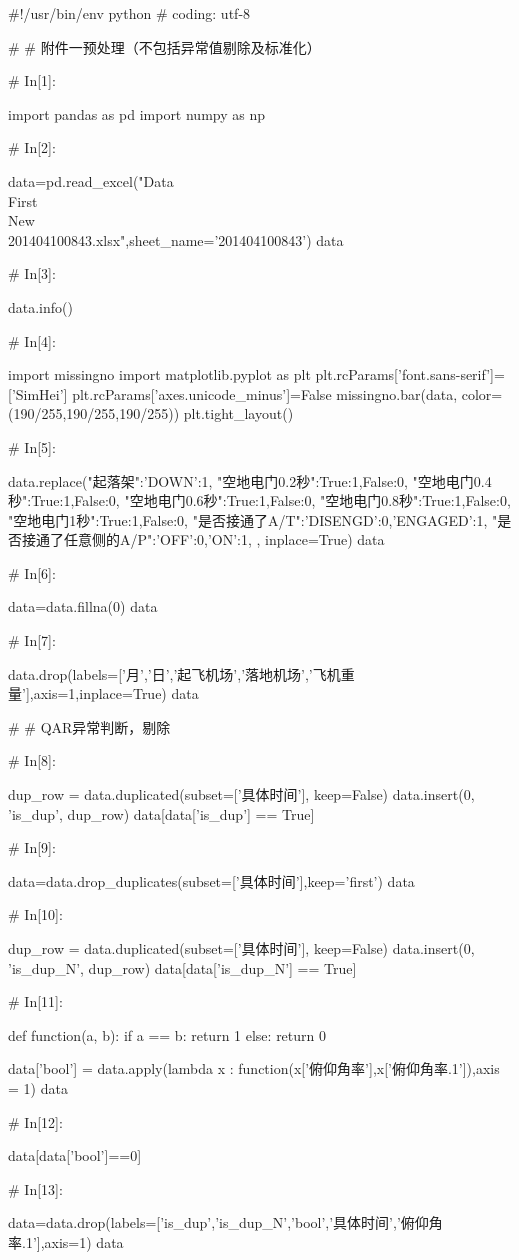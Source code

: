 \documentclass{MathorCupModeling}
\begin{document}
\begin{python}
#!/usr/bin/env python
# coding: utf-8

# # 附件一预处理（不包括异常值剔除及标准化）

# In[1]:


import pandas as pd
import numpy as np


# In[2]:


data=pd.read_excel("Data\\First\\New\\201404100843.xlsx",sheet_name='201404100843')
data


# In[3]:


data.info()


# In[4]:


import missingno
import matplotlib.pyplot as plt
plt.rcParams['font.sans-serif']=['SimHei']
plt.rcParams['axes.unicode_minus']=False
missingno.bar(data, color=(190/255,190/255,190/255))
plt.tight_layout()


# In[5]:


data.replace({"起落架":{'DOWN':1},
              "空地电门0.2秒":{True:1,False:0},
              "空地电门0.4秒":{True:1,False:0},
              "空地电门0.6秒":{True:1,False:0},
              "空地电门0.8秒":{True:1,False:0},
              "空地电门1秒":{True:1,False:0},
              "是否接通了A/T":{'DISENGD':0,'ENGAGED':1},
              "是否接通了任意侧的A/P":{'OFF':0,'ON':1},
              }, inplace=True)
data


# In[6]:


data=data.fillna(0)
data


# In[7]:


data.drop(labels=['月','日','起飞机场','落地机场','飞机重量'],axis=1,inplace=True)
data


# # QAR异常判断，剔除

# In[8]:


dup_row = data.duplicated(subset=['具体时间'], keep=False)
data.insert(0, 'is_dup', dup_row)
data[data['is_dup'] == True]


# In[9]:


data=data.drop_duplicates(subset=['具体时间'],keep='first')
data


# In[10]:


dup_row = data.duplicated(subset=['具体时间'], keep=False)
data.insert(0, 'is_dup_N', dup_row)
data[data['is_dup_N'] == True]


# In[11]:


def function(a, b):
    if a == b:
        return 1
    else:
        return 0


data['bool'] = data.apply(lambda x : function(x['俯仰角率'],x['俯仰角率.1']),axis = 1)
data


# In[12]:


data[data['bool']==0]


# In[13]:


data=data.drop(labels=['is_dup','is_dup_N','bool','具体时间','俯仰角率.1'],axis=1)
data


\end{python}
\end{document}
